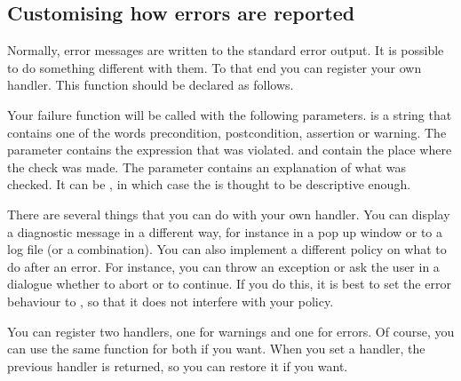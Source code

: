 \begin{ccAdvanced}

\section{Customising how errors are reported}

Normally, error messages are written to the standard error output.
It is possible to do something different with them.
To that end you can register your own handler.
This function should be declared as follows.

\ccTexHtml{\begin{samepage}}{}
\renewcommand{\ccLongParamLayout}{\ccTrue}

\lcTex{\ccAutoIndexingOff}
\ccTexHtml{\end{samepage}}{}
\lcTex{\ccAutoIndexingOn}

Your failure function will be called with the following parameters.
 is a string that contains one of the words precondition,
postcondition, assertion or warning. 
The parameter  contains the expression that was violated.
 and  contain the place where the check was made.
The  parameter contains an explanation of what was 
checked. 
It can be , in which case the  is thought
to be descriptive enough.

There are several things that you can do with your own handler.
You can display a diagnostic message in a different way, for instance in 
a pop up window or to a log file (or a combination).
You can also implement a different policy on what to do after an error.
For instance, you can throw an exception or ask the user in a dialogue 
whether to abort or to continue.
If you do this, it is best to set the error behaviour to
, so that it does not interfere with your policy.

You can register two handlers, one for warnings and one for errors.
Of course, you can use the same function for both if you want.
When you set a handler, the previous handler is returned, so you can restore
it if you want.


\ccGlueBegin
{}


\end{ccAdvanced}

